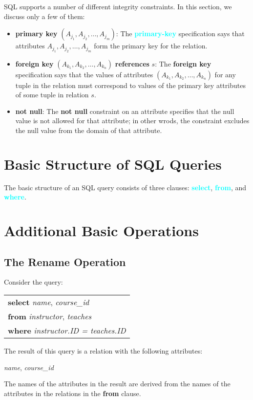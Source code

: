 \documentclass[a4paper,12pt,twoside,openany]{book}
\newcommand{\textcy}[1]{\textbf{\textcolor{cyan}{#1}}}
\begin{document}
SQL supports a number of different integrity constraints. In this section, we discuss only a few of them:
\begin{itemize}
    \item\textbf{primary key} $(A_{j_1},A_{j_2},\ldots,A_{j_m})$: The \textcy{primary-key} specification says that attributes $A_{j_1},A_{j_2},\ldots,A_{j_m}$ form the primary key for the relation.
    \item\textbf{foreign key} $(A_{k_1},A_{k_2},\ldots,A_{k_n})$ \textbf{references} $s$: The \textbf{foreign key} specification says that the values of attributes $(A_{k_1},A_{k_2},\ldots,A_{k_n})$ for any tuple in the relation must correspond to values of the primary key attributes of some tuple in relation $s$.
    \item\textbf{not null}: The \textbf{not null} constraint on an attribute specifies that the null value is not allowed for that attribute; in other wrods, the constraint excludes the null value from the domain of that attribute.
\end{itemize}

\section{Basic Structure of SQL Queries}

The basic structure of an SQL query consists of three clauses: \textcy{select}, \textcy{from}, and \textcy{where}.

\section{Additional Basic Operations}
\subsection{The Rename Operation}

Consider the query:
\begin{center}
    \begin{tabular}{l}
        \textbf{select} \textit{name}, \textit{course\_id}\\
        \textbf{from} \textit{instructor}, \textit{teaches}\\
        \textbf{where} \textit{instructor.ID = teaches.ID}
    \end{tabular}
\end{center}
The result of this query is a relation with the following attributes:
\begin{center}
    \textit{name}, \textit{course\_id}
\end{center}
The names of the attributes in the result are derived from the names of the attributes in the relations in the \textbf{from} clause.
\end{document}
